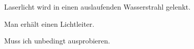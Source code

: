 Laserlicht wird in einen auslaufenden Wasserstrahl gelenkt.

Man erhält einen Lichtleiter.

Muss ich unbedingt ausprobieren.

